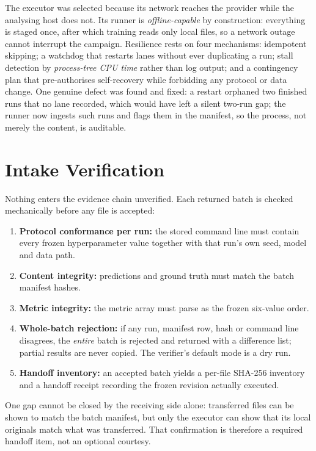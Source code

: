 \documentclass[conference]{IEEEtran}
\begin{document}
The executor was selected because its network reaches the provider while the analysing host does not.
Its runner is \emph{offline-capable} by construction: everything is staged once, after which training
reads only local files, so a network outage cannot interrupt the campaign. Resilience rests on four
mechanisms: idempotent skipping; a watchdog that restarts lanes without ever
duplicating a run; stall detection by \emph{process-tree CPU time} rather than log output;
and a contingency plan that pre-authorises self-recovery while forbidding any protocol or data
change. One genuine defect was found and fixed: a restart orphaned two
finished runs that no lane recorded, which would have left a silent two-run gap; the runner now
ingests such runs and flags them in the manifest, so the process, not merely the content, is
auditable.

\section{Intake Verification}
\label{sec:verify}

Nothing enters the evidence chain unverified. Each returned batch is checked mechanically before any
file is accepted:
\begin{enumerate}
\item \textbf{Protocol conformance per run:} the stored command line must contain every frozen
hyperparameter value together with that run's own seed, model and data path.
\item \textbf{Content integrity:} predictions and ground truth must match the batch manifest hashes.
\item \textbf{Metric integrity:} the metric array must parse as the frozen six-value order.
\item \textbf{Whole-batch rejection:} if any run, manifest row, hash or command line disagrees, the
\emph{entire} batch is rejected and returned with a difference list; partial results are never
copied. The verifier's default mode is a dry run.
\item \textbf{Handoff inventory:} an accepted batch yields a per-file SHA-256 inventory and a handoff
receipt recording the frozen revision actually executed.
\end{enumerate}

One gap cannot be closed by the receiving side alone: transferred files can be shown to match the
batch manifest, but only the executor can show that its local originals match what was transferred.
That confirmation is therefore a required handoff item, not an optional courtesy.
\end{document}

